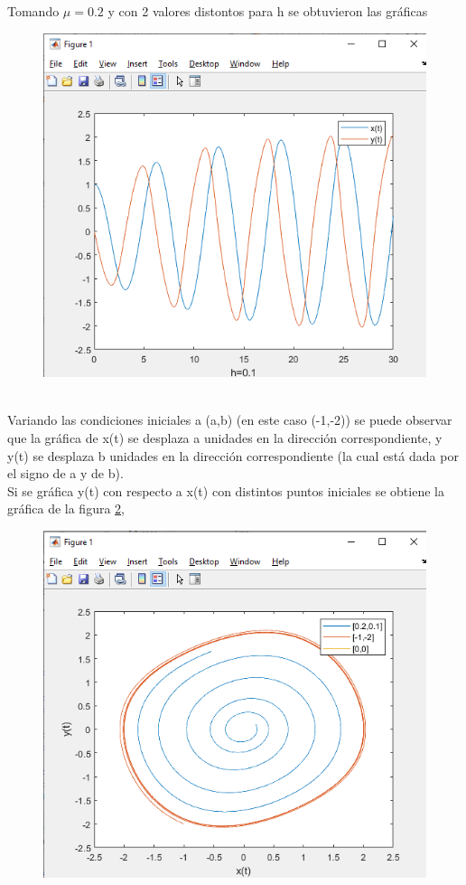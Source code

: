 \documentclass[12pt]{article}
\begin{document}
Tomando $\mu = 0.2$ y con 2 valores distontos para h se obtuvieron las gráficas
\begin{figure}[h]
	\centering
	\caption{}
	\includegraphics[scale=0.45]{graf5.png}
	\label{graf5}
\end{figure}\\
Variando las condiciones iniciales a (a,b) (en este caso (-1,-2)) se puede observar que la gráfica de x(t) se desplaza a unidades en la dirección correspondiente, y y(t) se desplaza b unidades en la dirección correspondiente (la cual está dada por el signo de a y de b).\\
Si se gráfica y(t) con respecto a x(t) con distintos puntos iniciales se obtiene la gráfica de la figura \ref{graf9},\\
\begin{figure}[h]
\centering
\caption{}
\includegraphics[scale=0.45]{graf9.png}
\label{graf9}
\end{figure}\\
\end{document}
